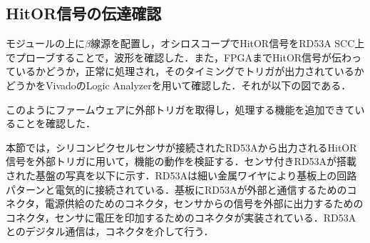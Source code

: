 \subsection{HitOR信号の伝達確認}
モジュールの上に$\beta$線源を配置し，オシロスコープでHitOR信号をRD53A SCC上でプローブすることで，波形を確認した．また，FPGAまでHitOR信号が伝わっているかどうか，正常に処理され，そのタイミングでトリガが出力されているかどうかをVivadoのLogic Analyzerを用いて確認した．それが以下の図である．



このようにファームウェアに外部トリガを取得し，処理する機能を追加できていることを確認した．



本節では，シリコンピクセルセンサが接続されたRD53Aから出力されるHitOR信号を外部トリガに用いて，機能の動作を検証する．センサ付きRD53Aが搭載された基盤の写真を以下に示す．RD53Aは細い金属ワイヤにより基板上の回路パターンと電気的に接続されている．基板にRD53Aが外部と通信するためのコネクタ，電源供給のためのコネクタ，センサからの信号を外部に出力するためのコネクタ，センサに電圧を印加するためのコネクタが実装されている．RD53Aとのデジタル通信は，コネクタを介して行う．



